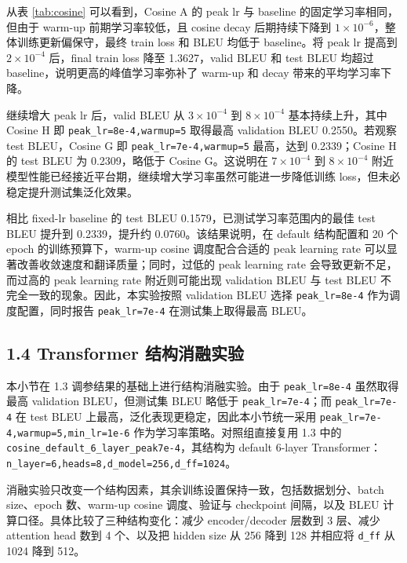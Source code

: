 ﻿\documentclass[UTF8,a4paper,12pt]{ctexart}
\begin{document}
从表 \ref{tab:cosine} 可以看到，Cosine A 的 peak lr 与 baseline 的固定学习率相同，但由于 warm-up 前期学习率较低，且 cosine decay 后期持续下降到 $1\times10^{-6}$，整体训练更新偏保守，最终 train loss 和 BLEU 均低于 baseline。将 peak lr 提高到 $2\times10^{-4}$ 后，final train loss 降至 1.3627，valid BLEU 和 test BLEU 均超过 baseline，说明更高的峰值学习率弥补了 warm-up 和 decay 带来的平均学习率下降。

继续增大 peak lr 后，valid BLEU 从 $3\times10^{-4}$ 到 $8\times10^{-4}$ 基本持续上升，其中 Cosine H 即 \texttt{peak\_lr=8e-4,warmup=5} 取得最高 validation BLEU 0.2550。若观察 test BLEU，Cosine G 即 \texttt{peak\_lr=7e-4,warmup=5} 最高，达到 0.2339；Cosine H 的 test BLEU 为 0.2309，略低于 Cosine G。这说明在 $7\times10^{-4}$ 到 $8\times10^{-4}$ 附近模型性能已经接近平台期，继续增大学习率虽然可能进一步降低训练 loss，但未必稳定提升测试集泛化效果。

相比 fixed-lr baseline 的 test BLEU 0.1579，已测试学习率范围内的最佳 test BLEU 提升到 0.2339，提升约 0.0760。该结果说明，在 default 结构配置和 20 个 epoch 的训练预算下，warm-up cosine 调度配合合适的 peak learning rate 可以显著改善收敛速度和翻译质量；同时，过低的 peak learning rate 会导致更新不足，而过高的 peak learning rate 附近则可能出现 validation BLEU 与 test BLEU 不完全一致的现象。因此，本实验按照 validation BLEU 选择 \texttt{peak\_lr=8e-4} 作为调度配置，同时报告 \texttt{peak\_lr=7e-4} 在测试集上取得最高 BLEU。

\subsection{1.4 Transformer 结构消融实验}

本小节在 1.3 调参结果的基础上进行结构消融实验。由于 \texttt{peak\_lr=8e-4} 虽然取得最高 validation BLEU，但测试集 BLEU 略低于 \texttt{peak\_lr=7e-4}；而 \texttt{peak\_lr=7e-4} 在 test BLEU 上最高，泛化表现更稳定，因此本小节统一采用 \texttt{peak\_lr=7e-4,warmup=5,min\_lr=1e-6} 作为学习率策略。对照组直接复用 1.3 中的 \texttt{cosine\_default\_6\_layer\_peak7e-4}，其结构为 default 6-layer Transformer：\texttt{n\_layer=6,heads=8,d\_model=256,d\_ff=1024}。

消融实验只改变一个结构因素，其余训练设置保持一致，包括数据划分、batch size、epoch 数、warm-up cosine 调度、验证与 checkpoint 间隔，以及 BLEU 计算口径。具体比较了三种结构变化：减少 encoder/decoder 层数到 3 层、减少 attention head 数到 4 个、以及把 hidden size 从 256 降到 128 并相应将 \texttt{d\_ff} 从 1024 降到 512。
\end{document}
